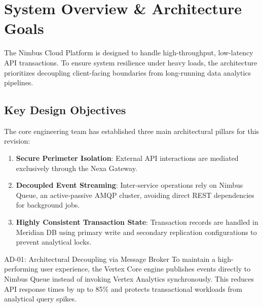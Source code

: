 \section{System Overview \& Architecture Goals}
The Nimbus Cloud Platform is designed to handle high-throughput, low-latency API transactions. To ensure system resilience under heavy loads, the architecture prioritizes decoupling client-facing boundaries from long-running data analytics pipelines.

\subsection{Key Design Objectives}
The core engineering team has established three main architectural pillars for this revision:
\begin{enumerate}[label=\textbf{\lbrack R\arabic*\rbrack}]
  \item \textbf{Secure Perimeter Isolation}: External API interactions are mediated exclusively through the Nexa Gateway.
  \item \textbf{Decoupled Event Streaming}: Inter-service operations rely on Nimbus Queue, an active-passive AMQP cluster, avoiding direct REST dependencies for background jobs.
  \item \textbf{Highly Consistent Transaction State}: Transaction records are handled in Meridian DB using primary write and secondary replication configurations to prevent analytical locks.
\end{enumerate}

\begin{decision}{AD-01: Architectural Decoupling via Message Broker}
To maintain a high-performing user experience, the Vertex Core engine publishes events directly to Nimbus Queue instead of invoking Vertex Analytics synchronously. This reduces API response times by up to 85\% and protects transactional workloads from analytical query spikes.
\end{decision}
